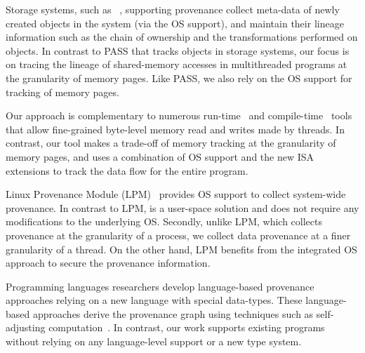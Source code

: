 

 Storage systems, such as ~\cite{pass-atc}, supporting provenance collect meta-data of newly created objects in the system (via the OS support), 
and  maintain their lineage information such as the chain of ownership and the transformations performed on objects. 
In contrast to PASS that tracks objects in storage systems,  our focus is on tracing the lineage of shared-memory accesses in multithreaded programs at the granularity of memory pages. Like PASS, we also rely on the OS support for tracking of memory pages.


 Our approach is complementary to numerous run-time~\cite{memtrace} and compile-time~\cite{cgo-compiler-provenance} tools that allow fine-grained byte-level memory read and writes made by threads. In contrast, our tool makes a trade-off of memory tracking at the granularity of memory pages, and uses a combination of OS support and the new ISA extensions to track the data flow for the entire program. %


 Linux Provenance Module (LPM)~\cite{lpm} provides OS support to collect system-wide provenance. In contrast to LPM, \projecttitle is a user-space solution and does not require any modifications to the underlying OS. Secondly, unlike LPM, which collects provenance at the granularity of a process, we collect data provenance at a finer granularity of a thread.  On the other hand, LPM benefits from the integrated OS approach to secure the provenance information. 

 Programming languages researchers develop language-based provenance approaches relying on a new language with special data-types. These language-based approaches derive the provenance graph using techniques such as self-adjusting computation~\cite{Acar05}. In contrast, our work supports existing programs without relying on any language-level support or a new type system.




